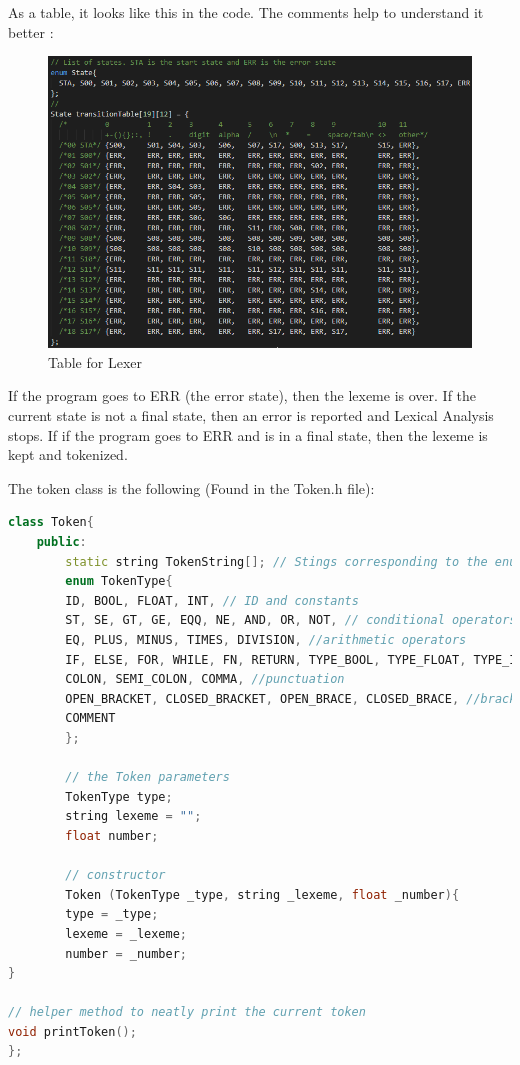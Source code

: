 As a table, it looks like this in the code. The comments help to understand it better \cite{StateTransitionTable}:
\begin{figure}[H]
	\centering
	\includegraphics[width=\textwidth]{Images/Q1_StateTransitionTable.PNG}
	\caption{Table for Lexer}
\end{figure}

If the program goes to ERR (the error state), then the lexeme is over. If the current state is not a final state, then an error is reported and Lexical Analysis stops. If if the program goes to ERR and is in a final state, then the lexeme is kept and tokenized.

The token class is the following (Found in the Token.h file):
\begin{lstlisting}[language=C++]
class Token{
	public:
		static string TokenString[]; // Stings corresponding to the enum of token types
		enum TokenType{
		ID, BOOL, FLOAT, INT, // ID and constants
		ST, SE, GT, GE, EQQ, NE, AND, OR, NOT, // conditional operators
		EQ, PLUS, MINUS, TIMES, DIVISION, //arithmetic operators
		IF, ELSE, FOR, WHILE, FN, RETURN, TYPE_BOOL, TYPE_FLOAT, TYPE_INT, VAR, //keywords
		COLON, SEMI_COLON, COMMA, //punctuation
		OPEN_BRACKET, CLOSED_BRACKET, OPEN_BRACE, CLOSED_BRACE, //brackets punctuation
		COMMENT
		};
		
		// the Token parameters
		TokenType type;
		string lexeme = "";
		float number;
		
		// constructor
		Token (TokenType _type, string _lexeme, float _number){
		type = _type;
		lexeme = _lexeme;
		number = _number;
}

// helper method to neatly print the current token
void printToken();
};
\end{lstlisting}

